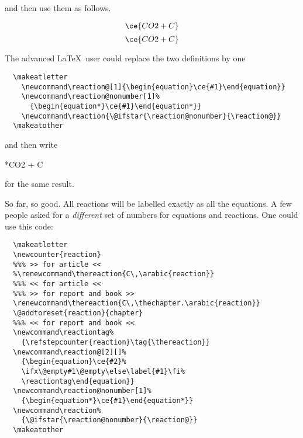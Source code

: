 \documentclass[a4paper,notitlepage,parskip=half]{scrreprt}
\begin{document}
and then use them as follows.

\newcommand\reaction[1]{\begin{equation}\ce{#1}\end{equation}}
\newcommand\reactionnonumber[1]%
  {\begin{equation*}\ce{#1}\end{equation*}}
\begin{SideBySideExample}[xrightmargin=5cm]
  \reaction{CO2 + C}
  \reactionnonumber{CO2 + C}
\end{SideBySideExample}

The advanced \LaTeX\ user could replace the two definitions by one
\begin{Verbatim}
  \makeatletter
    \newcommand\reaction@[1]{\begin{equation}\ce{#1}\end{equation}}
    \newcommand\reaction@nonumber[1]%
      {\begin{equation*}\ce{#1}\end{equation*}}
    \newcommand\reaction{\@ifstar{\reaction@nonumber}{\reaction@}}
  \makeatother
\end{Verbatim}

and then write

\makeatletter
  \newcommand\reaction@[1]{\begin{equation}\ce{#1}\end{equation}}
  \newcommand\reaction@nonumber[1]%
    {\begin{equation*}\ce{#1}\end{equation*}}
  \renewcommand\reaction{\@ifstar{\reaction@nonumber}{\reaction@}}
\makeatother
\begin{SideBySideExample}[xrightmargin=5cm]
  \reaction{CO2 + C}
  \reaction*{CO2 + C}
\end{SideBySideExample}

for the same result.

\minisec{}

So far, so good. All reactions will be labelled exactly as all the equations. A few people asked for a \emph{different} set of numbers for equations and reactions. One could use this code:

\begin{Verbatim}
  \makeatletter
  \newcounter{reaction}
  %%% >> for article <<
  %\renewcommand\thereaction{C\,\arabic{reaction}}
  %%% << for article <<
  %%% >> for report and book >>
  \renewcommand\thereaction{C\,\thechapter.\arabic{reaction}}
  \@addtoreset{reaction}{chapter}
  %%% << for report and book <<
  \newcommand\reactiontag%
    {\refstepcounter{reaction}\tag{\thereaction}}
  \newcommand\reaction@[2][]%
    {\begin{equation}\ce{#2}%
    \ifx\@empty#1\@empty\else\label{#1}\fi%
    \reactiontag\end{equation}}
  \newcommand\reaction@nonumber[1]%
    {\begin{equation*}\ce{#1}\end{equation*}}
  \newcommand\reaction%
    {\@ifstar{\reaction@nonumber}{\reaction@}}
  \makeatother
\end{Verbatim}
\end{document}
